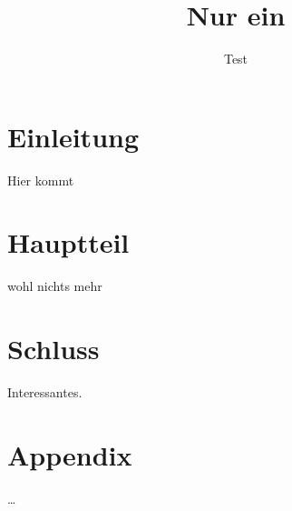 \documentclass[accentcolor=tud0b,12pt,paper=a4]{tudreport}
\title{Nur ein}
\subtitle{Test}
\begin{document}
	\maketitle
	\tableofcontents

	\chapter{Einleitung}
		Hier kommt

    \chapter{Hauptteil}
        wohl nichts mehr

    \chapter{Schluss}
        Interessantes.
\appendix
	\chapter{Appendix}
        \ldots
\end{document}

